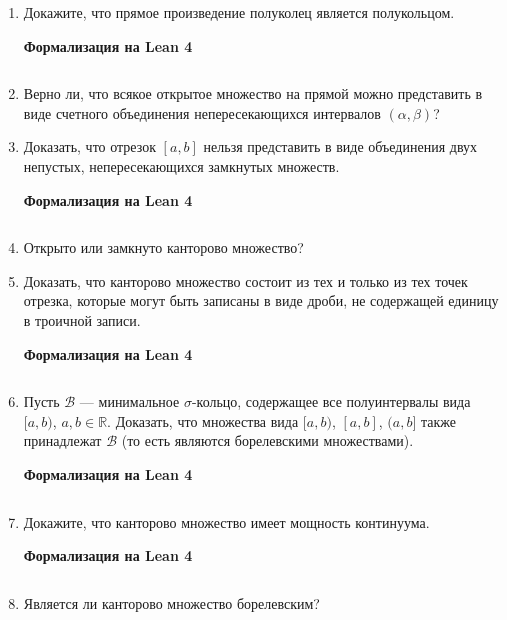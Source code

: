 \documentclass[12pt,a4paper]{article}
\begin{document}
\begin{enumerate}
\newpage
\item Докажите, что прямое произведение полуколец является полукольцом.

\begin{center}\small\textbf{Формализация на Lean 4}\end{center}
\inputminted{lean}{FunAn/Section01_SetAlgebra/Task06.lean}

\newpage

\item Верно ли, что всякое открытое множество на прямой можно представить в виде счетного объединения непересекающихся интервалов $(\alpha, \beta)$?
\newpage
\item Доказать, что отрезок $[a, b]$ нельзя представить в виде объединения двух непустых, непересекающихся замкнутых множеств.

\begin{center}\small\textbf{Формализация на Lean 4}\end{center}
\inputminted{lean}{FunAn/Section01_SetAlgebra/Task08.lean}

\newpage

\item Открыто или замкнуто канторово множество?
\newpage
\item Доказать, что канторово множество состоит из тех и только из тех точек отрезка, которые могут быть записаны в виде дроби, не содержащей единицу в троичной записи.

\begin{center}\small\textbf{Формализация на Lean 4}\end{center}
\inputminted{lean}{FunAn/Section01_SetAlgebra/Task10.lean}

\newpage
\item Пусть $\mathcal{B}$ — минимальное $\sigma$-кольцо, содержащее все полуинтервалы вида $[a, b)$, $a, b \in \mathbb{R}$. Доказать, что множества вида $[a, b)$, $[a, b]$, $(a, b]$ также принадлежат $\mathcal{B}$ (то есть являются борелевскими множествами).

\begin{center}\small\textbf{Формализация на Lean 4}\end{center}
\inputminted{lean}{FunAn/Section01_SetAlgebra/Task11.lean}

\newpage
\item Докажите, что канторово множество имеет мощность континуума.

\begin{center}\small\textbf{Формализация на Lean 4}\end{center}
\inputminted{lean}{FunAn/Section01_SetAlgebra/Task12.lean}

\newpage

\item Является ли канторово множество борелевским?
\end{enumerate}
\end{document}
